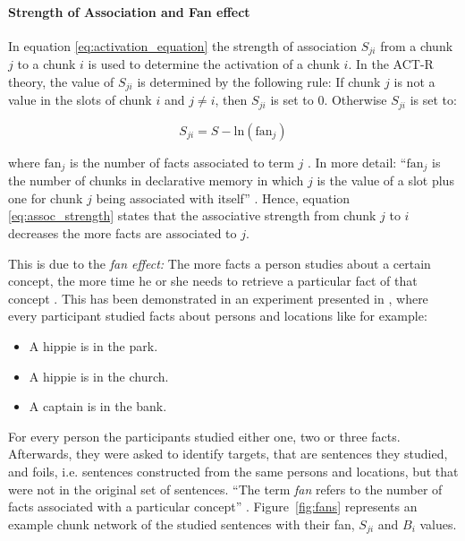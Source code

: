 \paragraph{Strength of Association and Fan effect}
\label{actr:fan_effect}

In equation \eqref{eq:activation_equation} the strength of association $S_{ji}$ from a chunk $j$ to a chunk $i$ is used to determine the activation of a chunk $i$.  In the ACT-R theory, the value of $S_{ji}$ is determined by the following rule: If chunk $j$ is not a value in the slots of chunk $i$ and $j \neq i$, then $S_{ji}$ is set to 0. Otherwise $S_{ji}$ is set to: 

\begin{equation}
\label{eq:assoc_strength}
S_{ji} = S - \mathrm{ln}(\mathrm{fan}_j)
\end{equation}

where $\mathrm{fan}_j$ is the number of facts associated to term $j$ \cite[1042]{anderson_implications_2000}. In more detail: ``$\mathrm{fan}_j$ is the number of chunks in declarative memory in which $j$ is the value of a slot plus one for chunk $j$ being associated with itself'' \cite[unit 5, p. 2]{actr_tutorial}. Hence, equation \eqref{eq:assoc_strength} states that the associative strength from chunk $j$ to $i$ decreases the more facts are associated to $j$.

This is due to the \emph{fan effect:} The more facts a person studies about a certain concept, the more time he or she needs to retrieve a particular fact of that concept \cite[186]{anderson_fan_1999}. This has been demonstrated in an experiment presented in \cite{anderson_fan_1999}, where every participant studied facts about persons and locations like for example:

\begin{itemize}
 \item A hippie is in the park.
 \item A hippie is in the church.
 \item A captain is in the bank.
\end{itemize}

For every person the participants studied either one, two or three facts. Afterwards, they were asked to identify targets, that are sentences they studied, and foils, i.e. sentences constructed from the same persons and locations, but that were not in the original set of sentences. ``The term \emph{fan} refers to the number of facts associated with a particular concept'' \cite[186]{anderson_fan_1999}. Figure~\ref{fig:fans} represents an example chunk network of the studied sentences with their fan, $S_{ji}$ and $B_i$ values.

